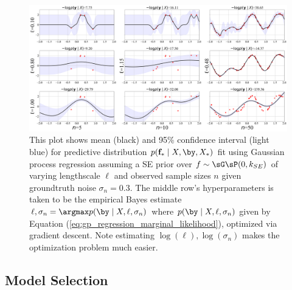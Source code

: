 \documentclass[11pt]{article}
\renewcommand\bf{\ensuremath{\mathbf{f}}}
\begin{document}
 
\begin{center} 
\begin{figure}[h!]
    \includegraphics[width=\textwidth]{assets/plt_gp_regression_inference.png} 
    \caption{This plot shows mean (black) and 95\% confidence interval (light blue) for predictive distribution $p(\bf_*\mid X,\by, X_*)$ fit using Gaussian process regression assuming a SE prior over $f\sim\sG\sP(0,k_{SE})$ of varying lengthscale $\ell$ and observed sample sizes $n$ given groundtruth noise $\sigma_n=0.3$. The middle row's hyperparameters is taken to be the empirical Bayes estimate $\ell,\sigma_n = \argmax p(\by\mid X, \ell,\sigma_n)$ where $p(\by\mid X,\ell,\sigma_n)$ given by Equation (\ref{eq:gp_regression_marginal_likelihood}), optimized via gradient descent. Note estimating $\log(\ell),\log(\sigma_n)$ makes the optimization problem much easier.}
    \label{fig:plt_gp_regression_inference}
\end{figure}
\end{center}

\subsection{Model Selection}
\end{document}
